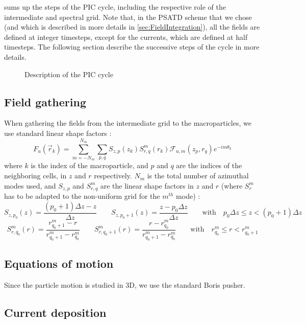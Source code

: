 \documentclass[a4paper]{article}   	%
\begin{document}
 sums up the steps of the PIC cycle, including the
respective role of the intermediate and spectral grid. Note that, in the PSATD
scheme that we chose (and which is described in more details in
\cref{sec:FieldIntegration}), all the fields are defined at integer
timesteps, except for the currents, which are defined at half
timesteps. The following section describe the successive steps of the cycle in more details.

\begin{figure}

\caption{Description of the PIC cycle \label{fig:GlobalScheme}}
\end{figure}

\subsection{Field gathering}

When gathering the fields from the intermediate grid to the macroparticles,
we use standard linear shape factors :
\[ F_u(\vec{r}_k) = \sum_{m=-N_m}^{N_m} \sum_{p,q} S_{z,p}(z_k)
S^m_{r,q}(r_k) \mathcal{F}_{u,m}(z_p, r_q) e^{-im\theta_k} \]
where $k$ is the index of the macroparticle, and $p$ and $q$ are the
indices of the neighboring cells, in $z$ and $r$ respectively. $N_m$ is the total number
of azimuthal modes used, and $S_{z,p}$ and $S^m_{r,q}$ are the linear
shape factors in $z$ and $r$ (where $S^m_r$ has to be adapted to the
non-uniform grid for the $m^{th}$ mode) :
\[ S_{z,p_0}(z) = \frac{(p_0+1)\Delta z - z}{\Delta z}  \qquad 
S_{z, p_0 +1}(z) = \frac{ z - p_0 \Delta z}{\Delta z} \qquad
\mathrm{with} \quad p_0 \Delta z \leq z < (p_0 +1) \Delta z \]
\[ S^m_{r,q_0}(r) = \frac{ r^m_{q_0+1} - r }{  r^m_{q_0+1} - r^m_{q_0} }
\qquad S^m_{r,q_0+1}(r) = \frac{ r - r^m_{q_0} }{  r^m_{q_0+1} - r^m_{q_0} }
\qquad \mathrm{with} \quad r^m_{q_0} \leq r < r^m_{q_0+1} \]

\subsection{Equations of motion}

Since the particle motion is studied in 3D, we use the standard Boris pusher.

\subsection{Current deposition}
\end{document}
